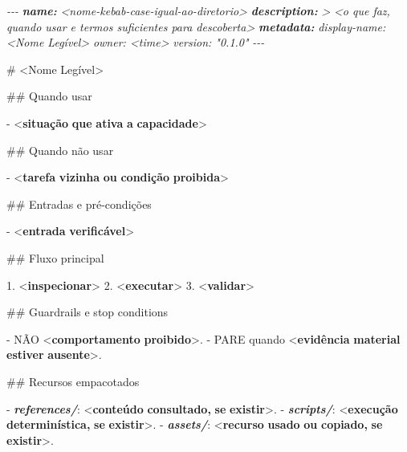 \documentclass[
  10pt,
  a4paper,
  oneside]{book}
\newenvironment{Shaded}{}{}
\newcommand{\AnnotationTok}[1]{\textcolor[rgb]{0.38,0.63,0.69}{\textbf{\textit{#1}}}}
\newcommand{\CommentTok}[1]{\textcolor[rgb]{0.38,0.63,0.69}{\textit{#1}}}
\newcommand{\DataTypeTok}[1]{\textcolor[rgb]{0.56,0.13,0.00}{#1}}
\newcommand{\ErrorTok}[1]{\textcolor[rgb]{1.00,0.00,0.00}{\textbf{#1}}}
\newcommand{\FunctionTok}[1]{\textcolor[rgb]{0.02,0.16,0.49}{#1}}
\newcommand{\InformationTok}[1]{\textcolor[rgb]{0.38,0.63,0.69}{\textbf{\textit{#1}}}}
\newcommand{\KeywordTok}[1]{\textcolor[rgb]{0.00,0.44,0.13}{\textbf{#1}}}
\newcommand{\NormalTok}[1]{#1}
\newcommand{\SpecialStringTok}[1]{\textcolor[rgb]{0.73,0.40,0.53}{#1}}
\begin{document}
\begin{Shaded}
\begin{Highlighting}[]
\CommentTok{{-}{-}{-}}
\AnnotationTok{name:}\CommentTok{ \textless{}nome{-}kebab{-}case{-}igual{-}ao{-}diretorio\textgreater{}}
\AnnotationTok{description:}\CommentTok{ \textgreater{}}
\CommentTok{  \textless{}o que faz, quando usar e termos suficientes para descoberta\textgreater{}}
\AnnotationTok{metadata:}
\CommentTok{  display{-}name: \textless{}Nome Legível\textgreater{}}
\CommentTok{  owner: \textless{}time\textgreater{}}
\CommentTok{  version: "0.1.0"}
\CommentTok{{-}{-}{-}}

\FunctionTok{\# \textless{}Nome Legível\textgreater{}}

\FunctionTok{\#\# Quando usar}

\SpecialStringTok{{-} }\DataTypeTok{\textless{}}\KeywordTok{situação} \ErrorTok{que} \ErrorTok{ativa} \ErrorTok{a} \ErrorTok{capacidade}\DataTypeTok{\textgreater{}}

\FunctionTok{\#\# Quando não usar}

\SpecialStringTok{{-} }\DataTypeTok{\textless{}}\KeywordTok{tarefa} \ErrorTok{vizinha} \ErrorTok{ou} \ErrorTok{condição} \ErrorTok{proibida}\DataTypeTok{\textgreater{}}

\FunctionTok{\#\# Entradas e pré{-}condições}

\SpecialStringTok{{-} }\DataTypeTok{\textless{}}\KeywordTok{entrada} \ErrorTok{verificável}\DataTypeTok{\textgreater{}}

\FunctionTok{\#\# Fluxo principal}

\SpecialStringTok{1. }\DataTypeTok{\textless{}}\KeywordTok{inspecionar}\DataTypeTok{\textgreater{}}
\SpecialStringTok{2. }\DataTypeTok{\textless{}}\KeywordTok{executar}\DataTypeTok{\textgreater{}}
\SpecialStringTok{3. }\DataTypeTok{\textless{}}\KeywordTok{validar}\DataTypeTok{\textgreater{}}

\FunctionTok{\#\# Guardrails e stop conditions}

\SpecialStringTok{{-} }\NormalTok{NÃO }\DataTypeTok{\textless{}}\KeywordTok{comportamento} \ErrorTok{proibido}\DataTypeTok{\textgreater{}}\NormalTok{.}
\SpecialStringTok{{-} }\NormalTok{PARE quando }\DataTypeTok{\textless{}}\KeywordTok{evidência} \ErrorTok{material} \ErrorTok{estiver} \ErrorTok{ausente}\DataTypeTok{\textgreater{}}\NormalTok{.}

\FunctionTok{\#\# Recursos empacotados}

\SpecialStringTok{{-} }\InformationTok{\textasciigrave{}references/\textasciigrave{}}\NormalTok{: }\DataTypeTok{\textless{}}\KeywordTok{conteúdo} \ErrorTok{consultado,} \ErrorTok{se} \ErrorTok{existir}\DataTypeTok{\textgreater{}}\NormalTok{.}
\SpecialStringTok{{-} }\InformationTok{\textasciigrave{}scripts/\textasciigrave{}}\NormalTok{: }\DataTypeTok{\textless{}}\KeywordTok{execução} \ErrorTok{determinística,} \ErrorTok{se} \ErrorTok{existir}\DataTypeTok{\textgreater{}}\NormalTok{.}
\SpecialStringTok{{-} }\InformationTok{\textasciigrave{}assets/\textasciigrave{}}\NormalTok{: }\DataTypeTok{\textless{}}\KeywordTok{recurso} \ErrorTok{usado} \ErrorTok{ou} \ErrorTok{copiado,} \ErrorTok{se} \ErrorTok{existir}\DataTypeTok{\textgreater{}}\NormalTok{.}


\end{Highlighting}
\end{Shaded}
\end{document}
